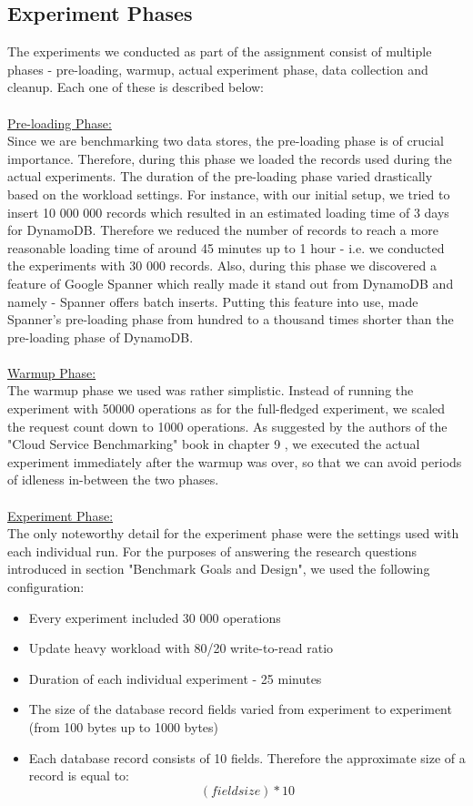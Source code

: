 \documentclass[letterpaper, 10 pt, conference]{ieeeconf}  %
\begin{document}
\subsection{Experiment Phases}
The experiments we conducted as part of the assignment consist of multiple phases - pre-loading, warmup, actual experiment phase, data collection and cleanup. Each one of these is described below:
\\
\\
\underline{Pre-loading Phase:}
\\
Since we are benchmarking two data stores, the pre-loading phase is of crucial importance. Therefore, during this phase we loaded the records used during the actual experiments. The duration of the pre-loading phase varied drastically based on the workload settings. For instance, with our initial setup, we tried to insert 10 000 000 records which resulted in an estimated loading time of 3 days for DynamoDB. Therefore we reduced the number of records to reach a more reasonable loading time of around 45 minutes up to 1 hour - i.e. we conducted the experiments with 30 000 records. Also, during this phase we discovered a feature of Google Spanner which really made it stand out from DynamoDB and namely - Spanner offers batch inserts. Putting this feature into use, made Spanner's pre-loading phase from hundred to a thousand times shorter than the pre-loading phase of DynamoDB. 
\\
\\
\underline{Warmup Phase:}
\\
The warmup phase we used was rather simplistic. Instead of running the experiment with 50000 operations as for the full-fledged experiment, we scaled the request count down to 1000 operations. As suggested by the authors of the "Cloud Service Benchmarking" book in chapter 9 \cite{StefanTaiBook}, we executed the actual experiment immediately after the warmup was over, so that we can avoid periods of idleness in-between the two phases.
\\
\\
\underline{Experiment Phase:}
\\
The only noteworthy detail for the experiment phase were the settings used with each individual run. For the purposes of answering the research questions introduced in section "Benchmark Goals and Design", we used the following configuration:
\begin{itemize}
    \item Every experiment included 30 000 operations
    \item Update heavy workload with 80/20 write-to-read ratio
    \item Duration of each individual experiment - 25 minutes
    \item The size of the database record fields varied from experiment to experiment (from 100 bytes up to 1000 bytes)
    \item Each database record consists of 10 fields. Therefore the approximate size of a record is equal to:
    $$
    (field size) * 10
    $$
\end{itemize}
\end{document}
